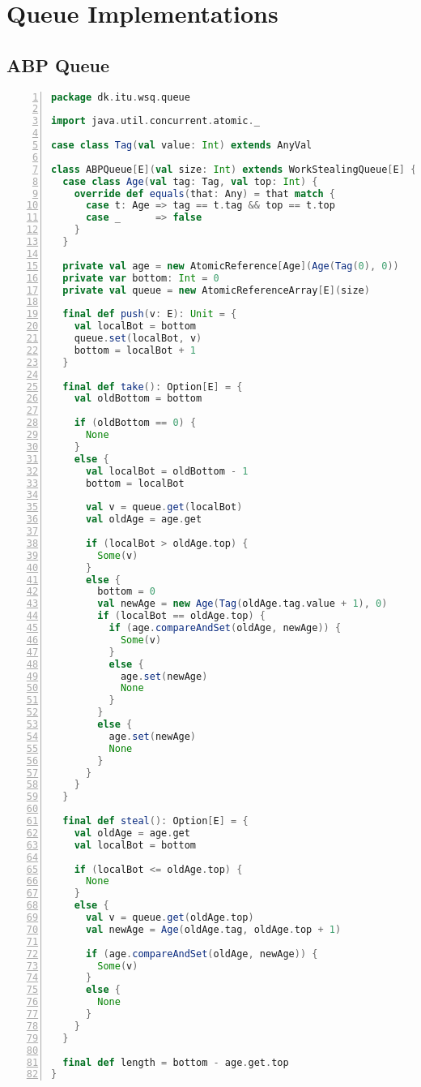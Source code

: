 \section{Queue Implementations}
\label{app:queue_impl}
\subsection{ABP Queue}
\begin{lstlisting}[language=scala,basicstyle=\ttfamily\bfseries\scriptsize,numbers=left]
package dk.itu.wsq.queue

import java.util.concurrent.atomic._

case class Tag(val value: Int) extends AnyVal

class ABPQueue[E](val size: Int) extends WorkStealingQueue[E] {
  case class Age(val tag: Tag, val top: Int) {
    override def equals(that: Any) = that match {
      case t: Age => tag == t.tag && top == t.top
      case _      => false
    }
  }

  private val age = new AtomicReference[Age](Age(Tag(0), 0))
  private var bottom: Int = 0
  private val queue = new AtomicReferenceArray[E](size)

  final def push(v: E): Unit = {
    val localBot = bottom
    queue.set(localBot, v)
    bottom = localBot + 1
  }

  final def take(): Option[E] = {
    val oldBottom = bottom

    if (oldBottom == 0) {
      None
    }
    else {
      val localBot = oldBottom - 1
      bottom = localBot

      val v = queue.get(localBot)
      val oldAge = age.get
      
      if (localBot > oldAge.top) {
        Some(v)
      }
      else {
        bottom = 0
        val newAge = new Age(Tag(oldAge.tag.value + 1), 0)
        if (localBot == oldAge.top) {
          if (age.compareAndSet(oldAge, newAge)) {
            Some(v)
          }
          else {
            age.set(newAge)
            None
          }
        }
        else {
          age.set(newAge)
          None
        }
      }
    }
  }

  final def steal(): Option[E] = {
    val oldAge = age.get
    val localBot = bottom

    if (localBot <= oldAge.top) {
      None
    }
    else {
      val v = queue.get(oldAge.top)
      val newAge = Age(oldAge.tag, oldAge.top + 1)

      if (age.compareAndSet(oldAge, newAge)) {
        Some(v)
      }
      else {
        None
      }
    }
  }

  final def length = bottom - age.get.top
}
\end{lstlisting}

